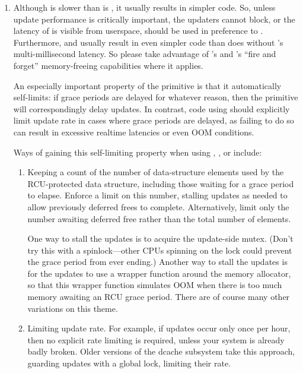 \begin{enumerate}[start=0]
\item	Although  is slower than is ,
	it usually results in simpler code.
	So, unless update
	performance is critically important, the updaters cannot block,
	or the latency of  is visible from userspace,
	 should be used in preference to .
	Furthermore,  and  usually result
	in even simpler code than does  without
	's multi-millisecond latency.
	So please take
	advantage of 's and 's ``fire and forget''
	memory-freeing capabilities where it applies.

	An especially important property of the 
	primitive is that it automatically self-limits{:} if grace periods
	are delayed for whatever reason, then the 
	primitive will correspondingly delay updates.
	In contrast,
	code using  should explicitly limit update rate in
	cases where grace periods are delayed, as failing to do so can
	result in excessive realtime latencies or even OOM conditions.

	Ways of gaining this self-limiting property when using ,
	, or  include:

	\begin{enumerate}
	\item	Keeping a count of the number of data-structure elements
		used by the RCU-protected data structure, including
		those waiting for a grace period to elapse.
		Enforce a
		limit on this number, stalling updates as needed to allow
		previously deferred frees to complete.
		Alternatively,
		limit only the number awaiting deferred free rather than
		the total number of elements.

		One way to stall the updates is to acquire the update-side
		mutex.
		(Don't try this with a spinlock---other CPUs
		spinning on the lock could prevent the grace period
		from ever ending.)
		Another way to stall the updates
		is for the updates to use a wrapper function around
		the memory allocator, so that this wrapper function
		simulates OOM when there is too much memory awaiting an
		RCU grace period.
		There are of course many other
		variations on this theme.

	\item	Limiting update rate.
		For example, if updates occur only
		once per hour, then no explicit rate limiting is
		required, unless your system is already badly broken.
		Older versions of the dcache subsystem take this approach,
		guarding updates with a global lock, limiting their rate.


\end{enumerate}
\end{enumerate}
